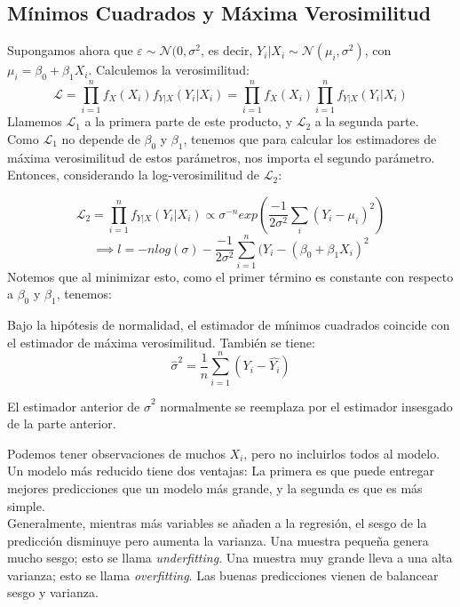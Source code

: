 \subsection{Mínimos Cuadrados y Máxima Verosimilitud}
Supongamos ahora que $\varepsilon \sim \mathcal{N}(0,\sigma^2$, es decir, 
$Y_i|X_i \sim \mathcal{N}(\mu_i,\sigma^2)$, con $\mu_i=\beta_0 + \beta_1 X_i$.
Calculemos la verosimilitud: 
$$
\mathcal{L}=\prod_{i=1}^{n}f_{X}(X_i) f_{Y|X}(Y_i|X_i)= \prod_{i=1}^{n}f_{X}(X_i) \prod_{i=1}^{n}f_{Y|X}(Y_i|X_i)
$$
Llamemos $\mathcal{L}_1$ a la primera parte de este producto, y $\mathcal{L}_2$ a la segunda parte. Como $\mathcal{L}_1$ no depende de $\beta_0 $ y $\beta_1$, tenemos que para calcular los estimadores de máxima verosimilitud de estos parámetros, nos importa el segundo parámetro. Entonces, considerando la log-verosimilitud de $\mathcal{L}_2$:

$$ \mathcal{L}_2 = \prod_{i=1}^{n} f_{Y|X}(Y_i|X_i) \propto \sigma^{-n} exp(\dfrac{-1}{2\sigma^2}\sum_{i} (Y_i-\mu_i)^2) 
$$ 
$$
\implies l=-nlog(\sigma)-\dfrac{-1}{2\sigma^2}\sum_{i=1}^{n}(Y_i-(\beta_0 + \beta_1 X_i)^2
$$
Notemos que al minimizar esto, como el primer término es constante con respecto a $\beta_0 $ y $\beta_1$, tenemos: 
\begin{theorem}
Bajo la hipótesis de normalidad, el estimador de mínimos cuadrados coincide con el estimador de máxima verosimilitud. También se tiene: 
$$
\hat{\sigma}^2=\dfrac{1}{n} \sum_{i=1}^{n}(Y_i-\hat{Y_i})
$$
\end{theorem}
\begin{remark}
El estimador anterior de $\hat{\sigma}^2$ normalmente se reemplaza por el estimador insesgado de la parte anterior. 
\end{remark}



\begin{remark} Podemos tener observaciones de muchos $X_i$, pero no incluirlos todos al modelo. Un modelo más reducido tiene dos ventajas: La primera es que puede entregar mejores predicciones que un modelo más grande, y la segunda es que es más simple.\\  
Generalmente, mientras más variables se añaden a la regresión, el sesgo de la predicción disminuye pero aumenta la varianza. Una muestra pequeña genera mucho sesgo; esto se llama \emph{underfitting}. Una muestra muy grande lleva a una alta varianza; esto se llama \emph{overfitting}. Las buenas predicciones vienen de balancear sesgo y varianza. 
\end{remark}

